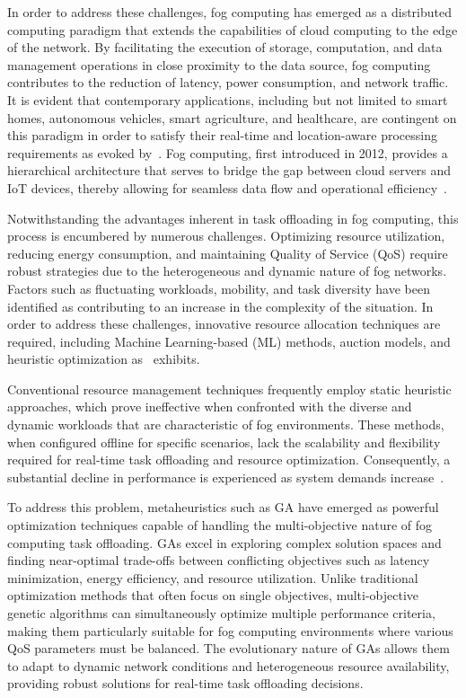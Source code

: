 \documentclass[preprint,3p,authoryear]{elsarticle}
\begin{document}
In order to address these challenges, fog computing has emerged as a distributed computing paradigm that extends the capabilities of cloud computing to the edge of the network. By facilitating the execution of storage, computation, and data management operations in close proximity to the data source, fog computing contributes to the reduction of latency, power consumption, and network traffic. It is evident that contemporary applications, including but not limited to smart homes, autonomous vehicles, smart agriculture, and healthcare, are contingent on this paradigm in order to satisfy their real-time and location-aware processing requirements as evoked by~\cite{das_review_2023}. Fog computing, first introduced in 2012, provides a hierarchical architecture that serves to bridge the gap between cloud servers and IoT devices, thereby allowing for seamless data flow and operational efficiency~\citep{fahimullah_review_2022}.

Notwithstanding the advantages inherent in task offloading in fog computing, this process is encumbered by numerous challenges. Optimizing resource utilization, reducing energy consumption, and maintaining Quality of Service (QoS) require robust strategies due to the heterogeneous and dynamic nature of fog networks. Factors such as fluctuating workloads, mobility, and task diversity have been identified as contributing to an increase in the complexity of the situation. In order to address these challenges, innovative resource allocation techniques are required, including Machine Learning-based (ML) methods, auction models, and heuristic optimization as~\cite{fahimullah_review_2022} exhibits.

Conventional resource management techniques frequently employ static heuristic approaches, which prove ineffective when confronted with the diverse and dynamic workloads that are characteristic of fog environments. These methods, when configured offline for specific scenarios, lack the scalability and flexibility required for real-time task offloading and resource optimization. Consequently, a substantial decline in performance is experienced as system demands increase~\citep{iftikhar_ai-based_2023}.

To address this problem, metaheuristics such as GA have emerged as powerful optimization techniques capable of handling the multi-objective nature of fog computing task offloading. GAs excel in exploring complex solution spaces and finding near-optimal trade-offs between conflicting objectives such as latency minimization, energy efficiency, and resource utilization. Unlike traditional optimization methods that often focus on single objectives, multi-objective genetic algorithms can simultaneously optimize multiple performance criteria, making them particularly suitable for fog computing environments where various QoS parameters must be balanced. The evolutionary nature of GAs allows them to adapt to dynamic network conditions and heterogeneous resource availability, providing robust solutions for real-time task offloading decisions.
\end{document}
